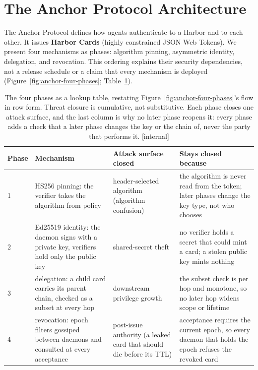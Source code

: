 \documentclass[11pt,a4paper]{article}
\theoremstyle{definition}
\begin{document}
\section{The Anchor Protocol Architecture}\label{sec:architecture}
The Anchor Protocol defines how agents authenticate to a Harbor and to each other.
It issues \textbf{Harbor Cards} (highly constrained JSON Web Tokens). We present
four mechanisms as phases: algorithm pinning, asymmetric identity, delegation,
and revocation. This ordering explains their security dependencies, not a release
schedule or a claim that every mechanism is deployed
(Figure~\ref{fig:anchor-four-phases}; Table~\ref{tab:anchor-four-phases}).

\begin{table}[H]
\centering
\caption{The four phases as a lookup table, restating Figure~\ref{fig:anchor-four-phases}'s flow in row form. Threat closure is cumulative, not substitutive. Each phase closes one attack
surface, and the last column is why no later phase reopens it: every phase adds a check
that a later phase changes the key or the chain of, never the party that performs it.
[internal]}
\label{tab:anchor-four-phases}
\small
\renewcommand{\arraystretch}{1.15}
\begin{tabularx}{\linewidth}{@{}l>{\raggedright\arraybackslash}X>{\raggedright\arraybackslash}X>{\raggedright\arraybackslash}X@{}}
\toprule
\textbf{Phase} & \textbf{Mechanism} & \textbf{Attack surface closed} & \textbf{Stays closed because} \\
\midrule
1 & HS256 pinning: the verifier takes the algorithm from policy & header-selected algorithm (algorithm confusion) & the algorithm is never read from the token; later phases change the key type, not who chooses \\
2 & Ed25519 identity: the daemon signs with a private key, verifiers hold only the public key & shared-secret theft & no verifier holds a secret that could mint a card; a stolen public key mints nothing \\
3 & delegation: a child card carries its parent chain, checked as a subset at every hop & downstream privilege growth & the subset check is per hop and monotone, so no later hop widens scope or lifetime \\
4 & revocation: epoch filters gossiped between daemons and consulted at every acceptance & post-issue authority (a leaked card that should die before its TTL) & acceptance requires the current epoch, so every daemon that holds the epoch refuses the revoked card \\
\bottomrule
\end{tabularx}
\end{table}
\end{document}
